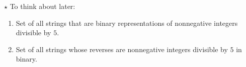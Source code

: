 \documentclass[12pt]{article}
\begin{document}
\begin{problem}{$\star$}
    To think about later: 
    \begin{enumerate}
        \item [5.] Set of all strings that are binary representations of nonnegative integers divisible by $5$.
        \item [6.]Set of all strings whose reverses are nonnegative integers divisible by $5$ in binary.
    \end{enumerate}
\end{problem}
\end{document}
